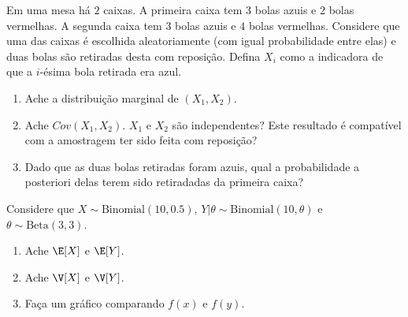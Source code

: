 \begin{exercise}
 Em uma mesa há $2$ caixas.
 A primeira caixa tem
 $3$ bolas azuis e $2$ bolas vermelhas.
 A segunda caixa tem
 $3$ bolas azuis e $4$ bolas vermelhas.
 Considere que uma das caixas é escolhida aleatoriamente
 (com igual probabilidade entre elas) e 
 duas bolas são retiradas desta com reposição.
 Defina $X_{i}$ como a indicadora de que
 a $i$-ésima bola retirada era azul.
 \begin{enumerate}[label=(\alph*)]
  \item Ache a distribuição marginal de
  $(X_{1},X_{2})$.
  \item Ache $Cov(X_{1},X_{2})$.
  $X_{1}$ e $X_{2}$ são independentes?
  Este resultado é compatível com
  a amostragem ter sido feita com reposição?
  \item Dado que as duas bolas retiradas foram azuis,
  qual a probabilidade a posteriori delas terem sido retiradadas da primeira caixa?
 \end{enumerate}
\end{exercise}

\begin{exercise}
 Considere que $X \sim \text{Binomial}(10, 0.5)$,
 $Y|\theta \sim \text{Binomial}(10, \theta)$ e
 $\theta \sim \text{Beta}(3, 3)$.
 \begin{enumerate}[label=(\alph*)]
  \item Ache $\E[X]$ e $\E[Y]$.
  \item Ache $\V[X]$ e $\V[Y]$.
  \item Faça um gráfico comparando
  $f(x)$ e $f(y)$.
 \end{enumerate}
\end{exercise}

